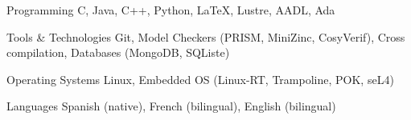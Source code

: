 


\begin{cvskills}


\cvskill
{Programming} %
{C, Java, C++, Python, LaTeX, Lustre, AADL, Ada} %


\cvskill
{Tools \& Technologies} %
{Git, Model Checkers (PRISM, MiniZinc, CosyVerif), Cross compilation, Databases 
(MongoDB, SQListe)} %


\cvskill
{Operating Systems} %
{Linux, Embedded OS (Linux-RT, Trampoline, POK, seL4)} %



\cvskill
{Languages} %
{Spanish (native), French (bilingual), English (bilingual)} %


\end{cvskills}